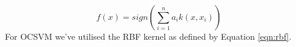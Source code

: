 \documentclass{mpaper}
\begin{document}
\begin{equation}
    f(x) = sign(\sum_{i=1}^n a_i k(x, x_i))
\end{equation}
For OCSVM we've utilised the RBF kernel as defined by Equation \ref{eqn:rbf}.




\end{document}
